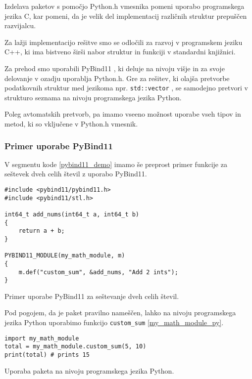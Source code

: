\documentclass[a4paper,12pt,openright]{book}
\begin{document}
    Izdelava paketov s pomočjo Python.h vmesnika pomeni uporabo programskega jezika C, kar pomeni, da je velik del implementacij različnih struktur prepuščen razvijalcu.
    
    Za lažji implementacijo rešitve smo se odločili za razvoj v programskem jeziku C++, ki ima bistveno širši nabor struktur in funkciji v standardni knjižnici. 

    Za prehod smo uporabili PyBind11 \cite{PYBIND11_GITHUB}, ki deluje na nivoju višje in za svoje delovanje v ozadju uporablja Python.h. Gre za rešitev, ki olajša pretvorbe podatkovnih struktur med jezikoma npr. {\tt std::vector} \cite{CPP_VECTOR}, se samodejno pretvori v strukturo seznama na nivoju programskega jezika Python.

    Poleg avtomatskih pretvorb, pa imamo vseeno možnost uporabe vseh tipov in metod, ki so vključene v Python.h vmesnik.

    \subsubsection{Primer uporabe PyBind11}
    V segmentu kode \ref{pybind11_demo} imamo še preprost primer funkcije za seštevek dveh celih števil z uporabo PyBind11.

\begin{code}
\begin{verbatim}
#include <pybind11/pybind11.h>
#include <pybind11/stl.h>

int64_t add_nums(int64_t a, int64_t b)
{
    return a + b;
}

PYBIND11_MODULE(my_math_module, m)
{
    m.def("custom_sum", &add_nums, "Add 2 ints");
}
\end{verbatim}
\caption{Primer uporabe PyBind11 za seštevanje dveh celih števil.}
\label{pybind11_demo}
\end{code}

    \noindent
    Pod pogojem, da je paket pravilno nameščen, lahko na nivoju programskega jezika Python uporabimo funkcijo {\tt custom\_sum} \ref{my_math_module_py}.

\begin{code}
\begin{verbatim}
import my_math_module
total = my_math_module.custom_sum(5, 10)
print(total) # prints 15
\end{verbatim}
\caption{Uporaba paketa na nivoju programskega jezika Python.}
\label{my_math_module_py}
\end{code}
\end{document}
